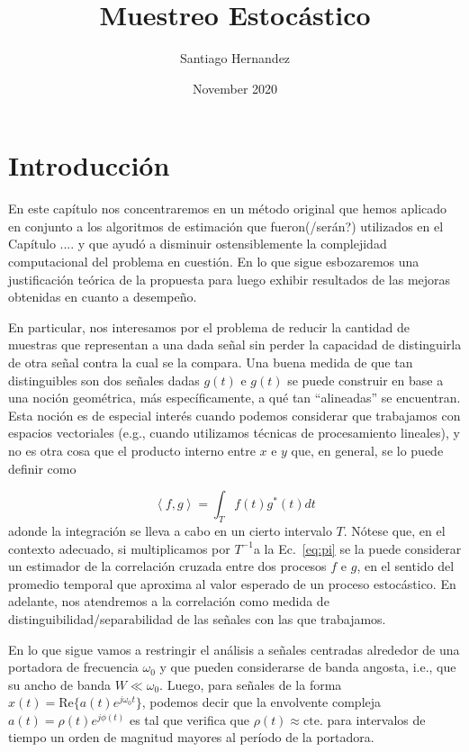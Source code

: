 \documentclass{article}
\title{Muestreo Estocástico}
\author{Santiago Hernandez}
\date{November 2020}
\begin{document}
\maketitle

\section{Introducción}
En este capítulo nos concentraremos en un método original que hemos aplicado en conjunto a los algoritmos de estimación que fueron(/serán?) utilizados en el Capítulo .... y que ayudó a disminuir ostensiblemente la complejidad computacional del problema en cuestión. En lo que sigue esbozaremos una justificación teórica de la propuesta para luego exhibir resultados de las mejoras obtenidas en cuanto a desempeño.

En particular, nos interesamos por el problema de reducir la cantidad de muestras que representan a una dada señal sin perder la capacidad de distinguirla de otra señal contra la cual se la compara. Una buena medida de que tan distinguibles son dos señales dadas $g(t)$ e $g(t)$ se puede construir en base a una noción geométrica, más específicamente, a qué tan ``alineadas'' se encuentran. Esta noción es de especial interés cuando podemos considerar que trabajamos con espacios vectoriales (e.g., cuando utilizamos técnicas de procesamiento lineales), y no es otra cosa que el producto interno entre $x$ e $y$ que, en general, se lo puede definir como

\begin{equation} \label{eq:pi}
    \left<f,g\right> = \int_T f(t) g^*(t) dt
\end{equation}
adonde la integración se lleva a cabo en un cierto intervalo $T$. Nótese que, en el contexto adecuado, si multiplicamos por $T^{-1}$a la Ec.~\ref{eq:pi} se la puede considerar un estimador de la correlación cruzada entre dos procesos $f$ e $g$, en el sentido del promedio temporal que aproxima al valor esperado de un proceso estocástico. En adelante, nos atendremos a la correlación como medida de distinguibilidad/separabilidad de las señales con las que trabajamos.

En lo que sigue vamos a restringir el análisis a señales centradas alrededor de una portadora de frecuencia $\omega_0$ y que pueden considerarse de banda angosta, i.e., que su ancho de banda $W \ll \omega_0$. Luego, para señales de la forma $x(t) = \mathrm{Re}\{a(t) e^{j \omega_0 t} \}$, podemos decir que la envolvente compleja $a(t)= \rho(t) e^{j \phi(t)}$ es tal que verifica que $\rho(t) \approx \mathrm{cte.}$ para intervalos de tiempo un orden de magnitud mayores al período de la portadora. 
\end{document}

